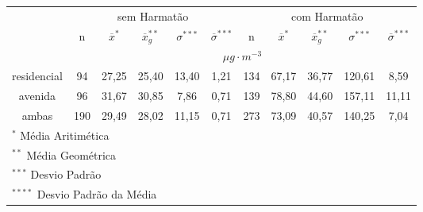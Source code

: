 \begin{tabular}{cccccc|ccccc}
  \hline
  &  \multicolumn{5}{c|}{sem Harmatão} & \multicolumn{5}{c}{com Harmatão} \\
 & n & $\overline{x}^*$ & $\overline{x}_g^{**}$ & $\sigma^{***}$ & $\overline{\sigma}^{***}$
 & n & $\overline{x}^*$ & $\overline{x}_g^{**}$ & $\sigma^{***}$ & $\overline{\sigma}^{***}$ \\
                       \hline & \multicolumn{10}{c}{$\mu g \cdot m^{-3}$} \\  \hline
residencial & 94 & 27,25 & 25,40 & 13,40 & 1,21 & 134 & 67,17 & 36,77 & 120,61 & 8,59 \\ 
  avenida   & 96 & 31,67 & 30,85 & 7,86 & 0,71 & 139 & 78,80 & 44,60 & 157,11 & 11,11 \\ 
  ambas     & 190 & 29,49 & 28,02 & 11,15 & 0,71 & 273 & 73,09 & 40,57 & 140,25 & 7,04 \\ 
   \hline
\multicolumn{11}{l}{$^{*}$ Média Aritimética} \\
\multicolumn{11}{l}{$^{**}$ Média Geométrica} \\
\multicolumn{11}{l}{$^{***}$ Desvio Padrão} \\
\multicolumn{11}{l}{$^{****}$ Desvio Padrão da Média} \\
\hline
\end{tabular}

